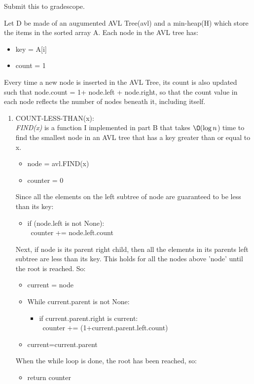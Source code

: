 \documentclass[12pt,twoside]{article}
\begin{document}
\begin{problems}
\problem Submit this to gradescope. %

\begin{problemparts}
\problempart 

Let D be made of an augumented AVL Tree(avl) and a min-heap(H) which store the items in the sorted array A. Each node in the AVL tree has: 
\begin{itemize}
	\item key = A[i]
	\item count = 1
\end{itemize} 
Every time a new node is inserted in the AVL Tree, its count is also updated such that node.count = 1+ node.left + node.right, so that the count value in each node reflects the number of nodes beneath it, including itself.
\begin{enumerate}
	\item COUNT-LESS-THAN(x):\\
	\textit{FIND(x)} is a function I implemented in part B that takes $ \O(\log n $) time to find the smallest node in an AVL tree that has a key greater than or equal to x. 
	\begin{itemize}
		\item node = avl.FIND(x)
		\item counter = 0
	\end{itemize}
Since all the elements on the left subtree of node are guaranteed to be less than its key:
\begin{itemize}
		\item if (node.left is not None):\\
		 \-\ counter += node.left.count
	\end{itemize}	
Next, if node is its parent right child, then all the elements in its parents left subtree are less than its key. This holds for all the nodes above 'node' until the root is reached. So:	
    \begin{itemize}
    			\item current = node
       \item While current.parent is not None:
		\begin{itemize}
			\item if current.parent.right is current:\\
			\-\ counter += (1+current.parent.left.count) 	
		\end{itemize}
	    \item current=current.parent
	\end{itemize}
When the while loop is done, the root has been reached, so: 
\begin{itemize} 
	    \item return counter
    \end{itemize}


\end{enumerate}
\end{problemparts}
\end{problems}
\end{document}
